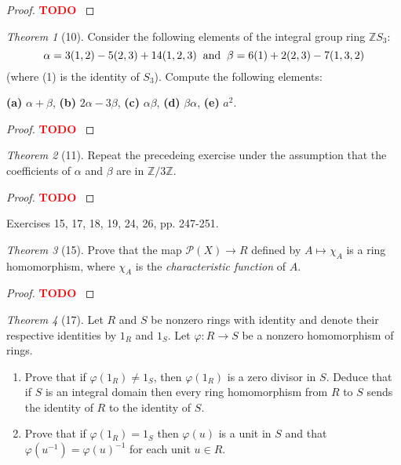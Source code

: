 \documentclass[12pt]{article}
\theoremstyle{remark}
\theoremstyle{named}
\newtheorem*{theorem}{Theorem}
\newcommand{\todo}{\textcolor{red}{\textbf{TODO} }}
\renewcommand{\a}{\alpha}
\renewcommand{\b}{\beta}
\newcommand{\Z}{\mathbb Z}
\begin{document}
\begin{proof}
    \todo 
\end{proof}

\begin{theorem}[10]
    Consider the following elements of the integral group ring \(\Z S_3\):
    \[\a = 3(1, 2) - 5(2, 3) + 14(1, 2, 3) \hspace{2mm} \text{and} \hspace{2mm} \b = 6(1) + 2(2, 3) - 7(1, 3, 2)\]
    (where (1) is the identity of \(S_3\)). Compute the following elements:

    \textbf{(a)} \(\a + \b\), \textbf{(b)} \(2\a - 3\b\), \textbf{(c)} \(\a \b\), \textbf{(d)} \(\b\a\), \textbf{(e)} \(a^2\).
\end{theorem}

\begin{proof}
    \todo
\end{proof}

\begin{theorem}[11]
    Repeat the precedeing exercise under the assumption that the coefficients of \(\a\) and \(\b\) are in \(\Z / 3\Z\).
\end{theorem}

\begin{proof}
    \todo
\end{proof}

Exercises 15, 17, 18, 19, 24, 26, pp. 247-251.

\begin{theorem}[15]
    Prove that the map \(\mathcal P(X) \to R\) defined by \(A \mapsto \chi_A\) is a ring homomorphism, where \(\chi_A\) is the \textit{characteristic function} of \(A\). 
\end{theorem}

\begin{proof}
    \todo 
\end{proof}

\begin{theorem}[17]
    Let \(R\) and \(S\) be nonzero rings with identity and denote their respective identities by \(1_R\) and \(1_S\). Let \(\varphi : R \to S\) be a nonzero homomorphism of rings. 
    \begin{enumerate}
        \item Prove that if \(\varphi(1_R) \neq 1_S\), then \(\varphi(1_R)\) is a zero divisor in \(S\). Deduce that if \(S\) is an integral domain then every ring homomorphism from \(R\) to \(S\) sends the identity of \(R\) to the identity of \(S\). 
        \item Prove that if \(\varphi(1_R) = 1_S\) then \(\varphi(u)\) is a unit in \(S\) and that \(\varphi(u^{-1}) = \varphi(u)^{-1}\) for each unit \(u \in R\). 
    \end{enumerate}
\end{theorem}
\end{document}
